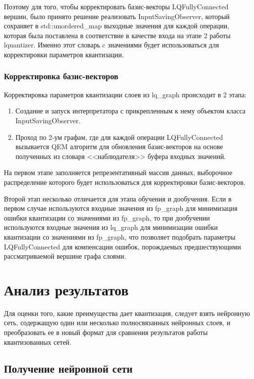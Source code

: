 Поэтому для того, чтобы корректировать базис-векторы LQFullyConnected вершин, было принято решение реализовать InputSavingObserver, который сохраняет в std::unordered\_map выходные значения для каждой операции, которая была поставлена в соответствие в качестве входа на этапе 2 работы lquantizer. Именно этот словарь c значениями будет использоваться для корректировки параметров квантизации.

\subsubsection{Корректировка базис-векторов}

Корректировка параметров квантизации слоев из lq\_graph происходит в 2 этапа:

\begin{enumerate}[label=\arabic*.]
    \item Создание и запуск интерпретатора с прикрепленным к нему объектом класса InputSavingObserver.
    \item Проход по 2-ум графам, где для каждой операции LQFullyConnected вызывается QEM алгоритм для обновления базис-векторов на основе полученных из словаря <<наблюдателя>> буфера входных значений.
\end{enumerate}

На первом этапе заполняется репрезентативный массив данных, выборочное распределение которого будет использоваться для корректировки базис-векторов.

Второй этап несколько отличается для этапа обучения и дообучения. Если в первом случае используются входные значения из fp\_graph для минимизация ошибки квантизации со значениями из fp\_graph, то при дообучении используются входные значения из lq\_graph для минимизации ошибки квантизации со значениями из fp\_graph, что позволяет подобрать параметры LQFullyConnected для компенсации ошибок, порождаемых предшествующими рассматриваемой вершине графа слоями.

\section{Анализ результатов}

Для оценки того, какие преимущества дает квантизация, следует взять нейронную сеть, содержащую один или несколько полносвязанных нейронных слоев, и преобразовать ее в новый формат для сравнения результатов работы квантизованных сетей.

\subsection{Получение нейронной сети}

